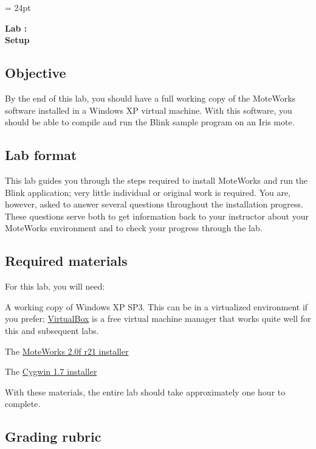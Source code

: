 \documentclass{article}
\begin{document}
\chead{\textcolor{Gray}{CSSE491 -- Mesh Networking}}
\headsep = 24pt

\begin{center}
{ \large
\textbf{Lab \labnumber: \longproductname} \\
\textbf{Setup}
}
\end{center}

\subsection*{Objective}
By the end of this lab, you should have a full working copy of the MoteWorks software installed in a Windows XP virtual machine. With this software, you should be able to compile and run the Blink sample program on an Iris mote.

\subsection*{Lab format}
This lab guides you through the steps required to install MoteWorks and run the Blink application; very little individual or original work is required. You are, however, asked to answer several questions throughout the installation progress. These questions serve both to get information back to your instructor about your MoteWorks environment and to check your progress through the lab.

\subsection*{Required materials}
For this lab, you will need:

\begin{itemize*}
\item A working copy of Windows XP SP3. This can be in a virtualized environment if you prefer; \href{https://www.virtualbox.org/}{VirtualBox} is a free virtual machine manager that works quite well for this and subsequent labs.
\item The \href{http://www.memsic.com/support/documentation/wireless-sensor-networks/category/9-software-downloads.html}{MoteWorks 2.0f r21 installer}
\item The \href{http://www.cygwin.com/}{Cygwin 1.7 installer}
\end{itemize*}

With these materials, the entire lab should take approximately one hour to complete.

\subsection*{Grading rubric}
\begin{tabular}{p{5.5in} r}
\end{tabular}
\end{document}
